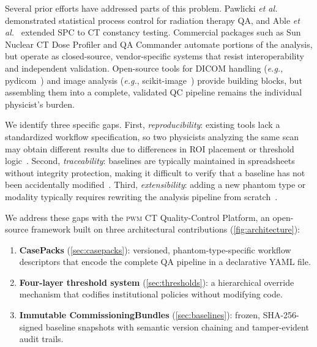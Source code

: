 \documentclass[11pt]{article}
\newcommand{\pwm}{\textsc{pwm}}
\newcommand{\eg}{\textit{e.g.}}
\newcommand{\etal}{\textit{et al.}}
\begin{document}
Several prior efforts have addressed parts of this problem.
Pawlicki \etal~\cite{pawlicki2005spc} demonstrated statistical
process control for radiation therapy QA, and Able \etal~\cite{able2016spc_ct}
extended SPC to CT constancy testing.
Commercial packages such as Sun Nuclear CT Dose Profiler and QA
Commander automate portions of the analysis, but operate as
closed-source, vendor-specific systems that resist interoperability
and independent validation.
Open-source tools for DICOM handling (\eg, pydicom~\cite{pydicom})
and image analysis (\eg, scikit-image~\cite{scikit_image}) provide
building blocks, but assembling them into a complete, validated QC
pipeline remains the individual physicist's burden.

We identify three specific gaps.
First, \emph{reproducibility}: existing tools lack a standardized
workflow specification, so two physicists analyzing the same scan may
obtain different results due to differences in ROI placement or
threshold logic~\cite{verdun2015image_quality}.
Second, \emph{traceability}: baselines are typically maintained in
spreadsheets without integrity protection, making it difficult to
verify that a baseline has not been accidentally
modified~\cite{mccollough2004ct_performance}.
Third, \emph{extensibility}: adding a new phantom type or modality
typically requires rewriting the analysis pipeline from
scratch~\cite{aapm_tg126,aapm_tg177}.

We address these gaps with the \pwm{} CT Quality-Control Platform,
an open-source framework built on three architectural contributions
(\cref{fig:architecture}):

\begin{enumerate}
  \item \textbf{CasePacks} (\cref{sec:casepacks}): versioned,
    phantom-type-specific workflow descriptors that encode the
    complete QA pipeline in a declarative YAML file.

  \item \textbf{Four-layer threshold system} (\cref{sec:thresholds}):
    a hierarchical override mechanism that codifies institutional
    policies without modifying code.

  \item \textbf{Immutable CommissioningBundles} (\cref{sec:baselines}):
    frozen, SHA-256-signed baseline snapshots with semantic version
    chaining and tamper-evident audit trails.
\end{enumerate}
\end{document}
